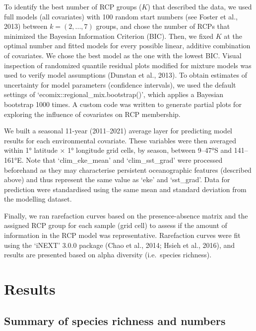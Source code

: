 \documentclass{article}
\begin{document}
\begin{linenumbers}
To identify the best number of RCP groups (\(K\)) that described the data, we used full models (all covariates) with 100 random start numbers (see Foster et al., 2013) between \(k = (2, ..., 7)\) groups, and chose the number of RCPs that minimized the Bayesian Information Criterion (BIC). Then, we fixed \(K\) at the optimal number and fitted models for every possible linear, additive combination of covariates. We chose the best model as the one with the lowest BIC. Visual inspection of randomized quantile residual plots modified for mixture models was used to verify model assumptions (Dunstan et al., 2013). To obtain estimates of uncertainty for model parameters (confidence intervals), we used the default settings of `ecomix::regional\_mix.bootstrap()', which applies a Bayesian bootstrap 1000 times. A custom code was written to generate partial plots for exploring the influence of covariates on RCP membership.

We built a seasonal 11-year (2011--2021) average layer for predicting model results for each environmental covariate. These variables were then averaged within 1° latitude \(\times\) 1° longitude grid cells, by season, between 9--47°S and 141--161°E. Note that `clim\_eke\_mean' and `clim\_sst\_grad' were processed beforehand as they may characterise persistent oceanographic features (described above) and thus represent the same value as `eke' and `sst\_grad'. Data for prediction were standardised using the same mean and standard deviation from the modelling dataset.

Finally, we ran rarefaction curves based on the presence-absence matrix and the assigned RCP group for each sample (grid cell) to assess if the amount of information in the RCP model was representative. Rarefaction curves were fit using the `iNEXT' 3.0.0 package (Chao et al., 2014; Hsieh et al., 2016), and results are presented based on alpha diversity (i.e.~species richness).

\hypertarget{results}{%
\section{Results}\label{results}}

\hypertarget{summary-of-species-richness-and-numbers}{%
\subsection{Summary of species richness and numbers}\label{summary-of-species-richness-and-numbers}}


\end{linenumbers}
\end{document}
